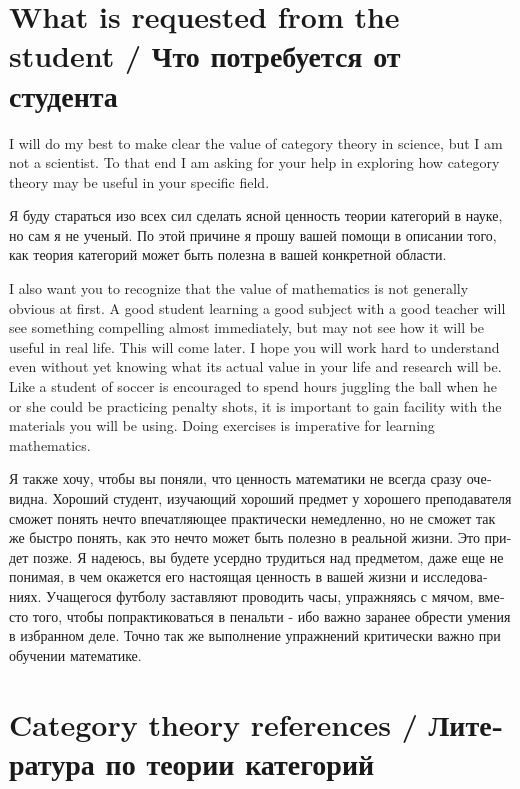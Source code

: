 \documentclass[a4paper]{book}
\theoremstyle{myth}
\begin{document}
\begin{russian}

\section{What is requested from the student / Что потребуется от студента}

I will do my best to make clear the value of category theory in science, but I am not a scientist. To that end I am asking for your help in exploring how category theory may be useful in your specific field.

Я буду стараться изо всех сил сделать ясной ценность теории категорий в науке, но сам я не ученый. По этой причине я прошу вашей помощи в описании того, как теория категорий может быть полезна в вашей конкретной области. 

I also want you to recognize that the value of mathematics is not generally obvious at first. A good student learning a good subject with a good teacher will see something compelling almost immediately, but may not see how it will be useful in real life. This will come later. I hope you will work hard to understand even without yet knowing what its actual value in your life and research will be. Like a student of soccer is encouraged to spend hours juggling the ball when he or she could be practicing penalty shots, it is important to gain facility with the materials you will be using. Doing exercises is imperative for learning mathematics.

Я также хочу, чтобы вы поняли, что ценность математики не всегда сразу очевидна. Хороший студент, изучающий хороший предмет у хорошего преподавателя сможет понять нечто впечатляющее практически немедленно, но не сможет так же быстро понять, как это нечто может быть полезно в реальной жизни. Это придет позже. Я надеюсь, вы будете усердно трудиться над предметом, даже еще не понимая, в чем окажется его настоящая ценность в вашей жизни и исследованиях. Учащегося футболу заставляют проводить часы, упражняясь с мячом, вместо того, чтобы попрактиковаться в пенальти - ибо важно заранее обрести умения в избранном деле. Точно так же выполнение упражнений критически важно при обучении математике. 


\section{Category theory references / Литература по теории категорий}


\end{russian}
\end{document}
